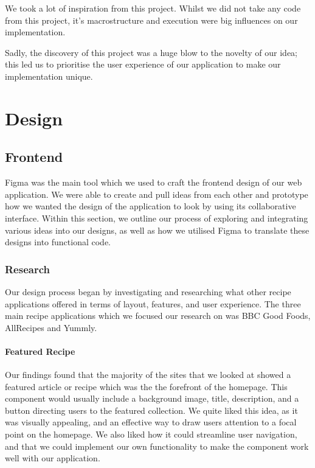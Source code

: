 \documentclass{article}
\begin{document}
We took a lot of inspiration from this project. Whilst we did not take any code from this project, it's macrostructure and execution were big influences on our implementation.

Sadly, the discovery of this project was a huge blow to the novelty of our idea; this led us to prioritise the user experience of our application to make our implementation unique.


\section{Design}
\subsection{Frontend}
Figma was the main tool which we used to craft the frontend design of our web application. We were able to create and pull ideas from each other and prototype how we wanted the design of the application to look by using its collaborative interface. Within this section, we outline our process of exploring and integrating various ideas into our designs, as well as how we utilised Figma to translate these designs into functional code.

\subsubsection{Research}

Our design process began by investigating and researching what other recipe applications offered in terms of layout, features, and user experience. The three main recipe applications which we focused our research on was BBC Good Foods, AllRecipes and Yummly. 

\paragraph{Featured Recipe}
Our findings found that the majority of the sites that we looked at showed a featured article or recipe which was the the forefront of the homepage. This component would usually include a background image, title, description, and a button directing users to the featured collection. We quite liked this idea, as it was visually appealing, and an effective way to draw users attention to a focal point on the homepage. We also liked how it could streamline user navigation, and that we could implement our own functionality to make the component work well with our application.
\end{document}
